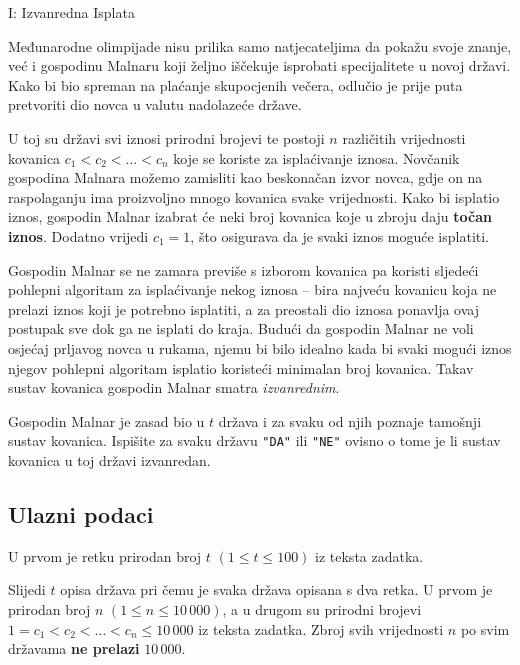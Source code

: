 \begin{statement}[
  timelimit=1 s,
  memorylimit=512 MiB,
]{I: Izvanredna Isplata}

Međunarodne olimpijade nisu prilika samo natjecateljima da pokažu svoje znanje,
već i gospodinu Malnaru koji željno iščekuje isprobati specijalitete u novoj
državi. Kako bi bio spreman na plaćanje skupocjenih večera, odlučio je prije
puta pretvoriti dio novca u valutu nadolazeće države.

U toj su državi svi iznosi prirodni brojevi te postoji $n$ različitih
vrijednosti kovanica $c_1 < c_2 < \dots < c_n$ koje se koriste za
isplaćivanje iznosa. Novčanik gospodina Malnara možemo zamisliti kao
beskonačan izvor novca, gdje on na raspolaganju ima proizvoljno mnogo
kovanica svake vrijednosti. Kako bi isplatio iznos, gospodin Malnar izabrat
će neki broj kovanica koje u zbroju daju \textbf{točan iznos}. Dodatno
vrijedi $c_1 = 1$, što osigurava da je svaki iznos moguće isplatiti.

Gospodin Malnar se ne zamara previše s izborom kovanica pa koristi sljedeći
pohlepni algoritam za isplaćivanje nekog iznosa -- bira najveću kovanicu koja
ne prelazi iznos koji je potrebno isplatiti, a za preostali dio iznosa
ponavlja ovaj postupak sve dok ga ne isplati do kraja. Budući da gospodin
Malnar ne voli osjećaj prljavog novca u rukama, njemu bi bilo idealno kada bi
svaki mogući iznos njegov pohlepni algoritam isplatio koristeći minimalan
broj kovanica. Takav sustav kovanica gospodin Malnar smatra
\textit{izvanrednim}.

Gospodin Malnar je zasad bio u $t$ država i za svaku od njih poznaje tamošnji
sustav kovanica. Ispišite za svaku državu \texttt{"DA"} ili \texttt{"NE"}
ovisno o tome je li sustav kovanica u toj državi izvanredan.

\subsection*{Ulazni podaci}
U prvom je retku prirodan broj $t$ $(1 \le t \le 100)$ iz teksta zadatka.

Slijedi $t$ opisa država pri čemu je svaka država opisana s dva retka. U prvom
je prirodan broj $n$ $(1 \le n \le 10\,000)$, a u drugom su
prirodni brojevi $1 = c_1 < c_2 < \dots < c_n \le 10\,000$ iz teksta zadatka.
Zbroj svih vrijednosti $n$ po svim državama \textbf{ne prelazi} $10\,000$.


\end{statement}
